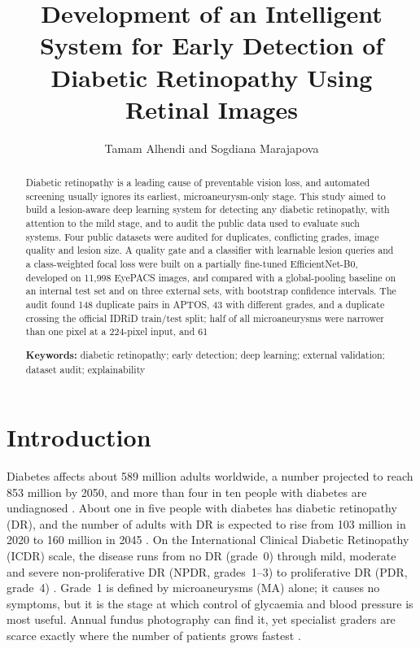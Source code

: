 \documentclass[11pt,a4paper]{article}
\title{\vspace{-1.2cm}\textbf{Development of an Intelligent System for Early Detection of Diabetic Retinopathy Using Retinal Images}}
\author{Tamam Alhendi and Sogdiana Marajapova}
\date{}
\begin{document}
\maketitle
\vspace{-0.9cm}
\begin{abstract}
\noindent Diabetic retinopathy is a leading cause of preventable vision loss, and automated screening usually ignores its earliest, microaneurysm-only stage. This study aimed to build a lesion-aware deep learning system for detecting any diabetic retinopathy, with attention to the mild stage, and to audit the public data used to evaluate such systems. Four public datasets were audited for duplicates, conflicting grades, image quality and lesion size. A quality gate and a classifier with learnable lesion queries and a class-weighted focal loss were built on a partially fine-tuned EfficientNet-B0, developed on 11,998 EyePACS images, and compared with a global-pooling baseline on an internal test set and on three external sets, with bootstrap confidence intervals. The audit found 148 duplicate pairs in APTOS, 43 with different grades, and a duplicate crossing the official IDRiD train/test split; half of all microaneurysms were narrower than one pixel at a 224-pixel input, and 61%

\medskip\noindent\textbf{Keywords:} diabetic retinopathy; early detection; deep learning; external validation; dataset audit; explainability
\end{abstract}
\section{Introduction}
Diabetes affects about 589 million adults worldwide, a number projected to reach 853 million by 2050, and more than four in ten people with diabetes are undiagnosed \cite{idf2025}. About one in five people with diabetes has diabetic retinopathy (DR), and the number of adults with DR is expected to rise from 103 million in 2020 to 160 million in 2045 \cite{teo2021}. On the International Clinical Diabetic Retinopathy (ICDR) scale, the disease runs from no DR (grade~0) through mild, moderate and severe non-proliferative DR (NPDR, grades~1--3) to proliferative DR (PDR, grade~4) \cite{wilkinson2003}. Grade~1 is defined by microaneurysms (MA) alone; it causes no symptoms, but it is the stage at which control of glycaemia and blood pressure is most useful. Annual fundus photography can find it, yet specialist graders are scarce exactly where the number of patients grows fastest \cite{idf2025}.
\end{document}
